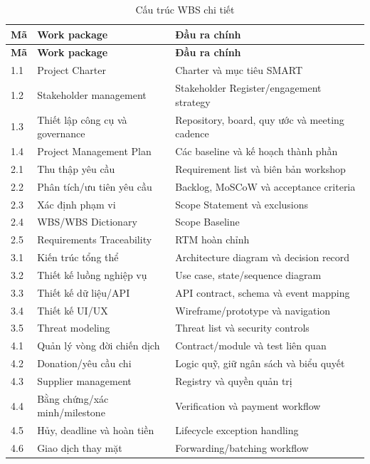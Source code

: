 \begin{longtable}{| p{1.2cm} | p{4.9cm} | p{6.7cm} |}
\caption{Cấu trúc WBS chi tiết}\label{tab:wbs-detail}\\
\hline
\textbf{Mã} & \textbf{Work package} & \textbf{Đầu ra chính} \\
\hline
\endfirsthead
\hline
\textbf{Mã} & \textbf{Work package} & \textbf{Đầu ra chính} \\
\hline
\endhead
1.1 & Project Charter & Charter và mục tiêu SMART \\ \hline
1.2 & Stakeholder management & Stakeholder Register/engagement strategy \\ \hline
1.3 & Thiết lập công cụ và governance & Repository, board, quy ước và meeting cadence \\ \hline
1.4 & Project Management Plan & Các baseline và kế hoạch thành phần \\
\hline
2.1 & Thu thập yêu cầu & Requirement list và biên bản workshop \\ \hline
2.2 & Phân tích/ưu tiên yêu cầu & Backlog, MoSCoW và acceptance criteria \\ \hline
2.3 & Xác định phạm vi & Scope Statement và exclusions \\ \hline
2.4 & WBS/WBS Dictionary & Scope Baseline \\ \hline
2.5 & Requirements Traceability & RTM hoàn chỉnh \\
\hline
3.1 & Kiến trúc tổng thể & Architecture diagram và decision record \\ \hline
3.2 & Thiết kế luồng nghiệp vụ & Use case, state/sequence diagram \\ \hline
3.3 & Thiết kế dữ liệu/API & API contract, schema và event mapping \\ \hline
3.4 & Thiết kế UI/UX & Wireframe/prototype và navigation \\ \hline
3.5 & Threat modeling & Threat list và security controls \\
\hline
4.1 & Quản lý vòng đời chiến dịch & Contract/module và test liên quan \\ \hline
4.2 & Donation/yêu cầu chi & Logic quỹ, giữ ngân sách và biểu quyết \\ \hline
4.3 & Supplier management & Registry và quyền quản trị \\ \hline
4.4 & Bằng chứng/xác minh/milestone & Verification và payment workflow \\ \hline
4.5 & Hủy, deadline và hoàn tiền & Lifecycle exception handling \\ \hline
4.6 & Giao dịch thay mặt & Forwarding/batching workflow \\ \hline

\end{longtable}

